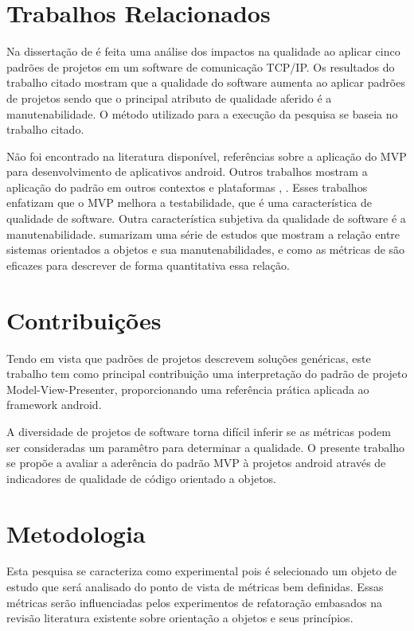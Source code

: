 \section{Trabalhos Relacionados}

Na dissertação de  é feita uma análise dos impactos na
qualidade ao aplicar cinco padrões de projetos em um software de comunicação
TCP/IP. Os resultados do trabalho citado mostram que a qualidade do software
aumenta ao aplicar padrões de projetos sendo que o principal atributo de
qualidade aferido é a manutenabilidade. O método utilizado para a execução da
pesquisa se baseia no trabalho citado. 

Não foi encontrado na literatura disponível, referências sobre a aplicação do
MVP para desenvolvimento de aplicativos android. Outros trabalhos mostram a
aplicação do padrão em outros contextos e plataformas  \cite{presenterfirst},
\cite{yangmvp}. Esses trabalhos enfatizam que o MVP melhora a
testabilidade, que é uma característica de qualidade de software. Outra
característica subjetiva da qualidade de software é a manutenabilidade.
 sumarizam uma série de estudos que mostram a relação
entre sistemas orientados a objetos e sua manutenabilidades, e como as métricas
de  são eficazes para descrever de forma quantitativa essa
relação.

\section{Contribuições}


Tendo em vista que padrões de projetos descrevem soluções genéricas, este
trabalho tem como principal contribuição uma interpretação do padrão de projeto
Model-View-Presenter, proporcionando uma referência prática aplicada ao
framework android.

A diversidade de projetos de software torna difícil inferir se as métricas
podem ser consideradas um paramêtro para determinar a qualidade. O presente
trabalho  se propõe a avaliar a aderência do padrão MVP à projetos android
através de indicadores de qualidade de código orientado a objetos.

\section{Metodologia}

Esta pesquisa se caracteriza como experimental pois é selecionado um objeto
de estudo que será analisado do ponto de vista de métricas bem definidas. Essas
métricas serão influenciadas pelos experimentos de refatoração embasados na
revisão literatura existente sobre orientação a objetos e seus princípios.

